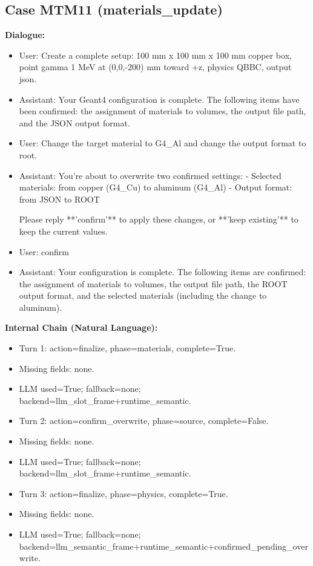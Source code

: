 \documentclass[11pt]{ctexart}
\begin{document}
\subsection{Case MTM11 (materials\_update)}
\textbf{Dialogue:}
\begin{itemize}
\item User: Create a complete setup: 100 mm x 100 mm x 100 mm copper box, point gamma 1 MeV at (0,0,-200) mm toward +z, physics QBBC, output json.
\item Assistant: Your Geant4 configuration is complete. The following items have been confirmed: the assignment of materials to volumes, the output file path, and the JSON output format.
\item User: Change the target material to G4\_Al and change the output format to root.
\item Assistant: You're about to overwrite two confirmed settings:
- Selected materials: from copper (G4\_Cu) to aluminum (G4\_Al)
- Output format: from JSON to ROOT

Please reply **'confirm'** to apply these changes, or **'keep existing'** to keep the current values.
\item User: confirm
\item Assistant: Your configuration is complete. The following items are confirmed: the assignment of materials to volumes, the output file path, the ROOT output format, and the selected materials (including the change to aluminum).
\end{itemize}
\textbf{Internal Chain (Natural Language):}
\begin{itemize}
\item Turn 1: action=finalize, phase=materials, complete=True.
\item Missing fields: none.
\item LLM used=True; fallback=none; backend=llm\_slot\_frame+runtime\_semantic.
\item Turn 2: action=confirm\_overwrite, phase=source, complete=False.
\item Missing fields: none.
\item LLM used=True; fallback=none; backend=llm\_slot\_frame+runtime\_semantic.
\item Turn 3: action=finalize, phase=physics, complete=True.
\item Missing fields: none.
\item LLM used=True; fallback=none; backend=llm\_semantic\_frame+runtime\_semantic+confirmed\_pending\_overwrite.
\end{itemize}
\end{document}
